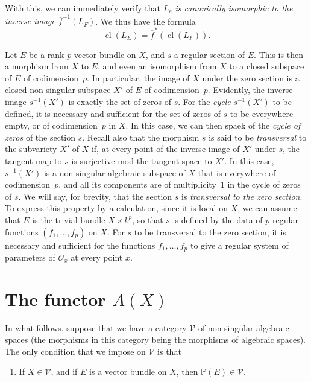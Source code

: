 \documentclass{article}
\newcommand{\scr}[1]{{\mathscr{#1}}}
\renewcommand{\cal}[1]{{\mathcal{#1}}}
\DeclareMathOperator{\cl}{cl}
\newcommand{\oldpage}[1]{\marginpar{\footnotesize$\Big\vert$ \textit{p.~#1}}}
\begin{document}
With this, we can immediately verify that \emph{$L_e$ is canonically isomorphic to the inverse image $\overline{f}^{-1}(L_F)$}.
We thus have the formula
\[
  \cl(L_E) = \overline{f}^*(\cl(L_F)).
\]

Let $E$ be a rank-$p$ vector bundle on $X$, and $s$ a regular section of $E$.
This is then a morphism from $X$ to $E$, and even an isomorphism from $X$ to a closed subspace of $E$ of codimension~$p$.
In particular, the image of $X$ under the zero section is a closed non-singular subspace $X'$ of $E$ of codimension~$p$.
Evidently, the inverse image $s^{-1}(X')$ is exactly the set of zeros of $s$.
For the \emph{cycle} $s^{-1}(X')$ to be defined, it is necessary and sufficient for the set of zeros of $s$ to be everywhere empty, or of codimension~$p$ in $X$.
In this case, we can then spaek of the \emph{cycle of zeros} of the section $s$.
Recall also that the morphism $s$ is said to be \emph{transversal} to the subvariety $X'$ of $X$ if, at every point of the inverse image of $X'$ under $s$, the tangent map to $s$ is surjective mod the tangent space to $X'$.
In this case, $s^{-1}(X')$ is a non-singular algebraic subspace of $X$ that is everywhere of codimension~$p$, and all its components are of multiplicity~$1$ in the cycle of zeros of $s$.
We will say, for brevity, that the section $s$ is \emph{transversal to the zero section}.
To express this property by a calculation, since it is local on $X$, we can assume that $E$ is the trivial bundle $X\times k^p$, so that $s$ is defined by the data of $p$ regular functions $(f_1,\ldots,f_p)$ on $X$.
For $s$ to be transversal to the zero section, it is necessary and sufficient for the functions $f_1,\ldots,f_p$ to give a regular system of parameters of $\scr{O}_x$ at every point $x$.


\section{The functor \texorpdfstring{$A(X)$}{A(X)}}
\label{section2}

\oldpage{140}

In what follows, suppose that we have a category $\cal{V}$ of non-singular algebraic spaces (the morphisms in this category being the morphisms of algebraic spaces).
The only condition that we impose on $\cal{V}$ is that
\begin{enumerate}[({V}1)]
  \item\label{axiomV1}
    If $X\in\cal{V}$, and if $E$ is a vector bundle on $X$, then $\mathbb{P}(E)\in\cal{V}$.
\end{enumerate}
\end{document}
